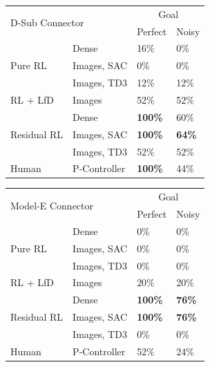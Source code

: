 \begin{figure}[btp]
\small
    \centering
        \begin{tabular}{|l|l|l|l|}
        \hline
        \multicolumn{2}{|l|}{\multirow{2}{*}{D-Sub Connector}} & \multicolumn{2}{c|}{Goal}                                 \\ \cline{3-4} 
        \multicolumn{2}{|l|}{}                     & \multicolumn{1}{c|}{Perfect} & \multicolumn{1}{c|}{Noisy} \\ \hline \hline
        \multirow{3}{*}{Pure RL} & Dense & 16\% & 0\% \\ 
         & Images, SAC & 0\% & 0\% \\
          & Images, TD3 & 12\% & 12\% \\ \hline
        \multirow{1}{*}{RL + LfD} & Images & 52\% & 52\% \\  \hline
        \multirow{3}{*}{Residual RL} & Dense & \textbf{100\%} & 60\% \\ 
         & Images, SAC & \textbf{100\%} & \textbf{64\%} \\
          & Images, TD3 & 52\% &  52\% \\ \hline
        \multirow{1}{*}{Human} & P-Controller & \textbf{100\%} & 44\% \\   \hline
        \end{tabular}
        \hfill
        \begin{tabular}{|l|l|l|l|}
        \hline
        \multicolumn{2}{|l|}{\multirow{2}{*}{Model-E Connector}} & \multicolumn{2}{c|}{Goal}                                 \\ \cline{3-4} 
        \multicolumn{2}{|l|}{}                     & \multicolumn{1}{c|}{Perfect} & \multicolumn{1}{c|}{Noisy} \\ \hline \hline
        \multirow{3}{*}{Pure RL} & Dense & 0\% & 0\% \\ 
         & Images, SAC & 0\% & 0\% \\ 
         & Images, TD3 & 0\% & 0\% \\ \hline
        \multirow{1}{*}{RL + LfD} & Images & 20\% & 20\% \\  \hline
        \multirow{3}{*}{Residual RL} & Dense & \textbf{100\%} & \textbf{76\%} \\ 
         & Images, SAC &\textbf{100\%} & \textbf{76\%} \\ 
           & Images, TD3 & 0\% & 0\% \\ \hline
        \multirow{1}{*}{Human} & P-Controller & 52\% & 24\% \\   \hline

\end{tabular}
\end{figure}
